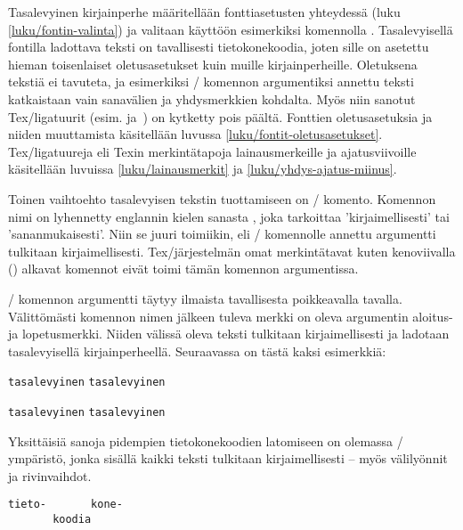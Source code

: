 Tasalevyinen kirjainperhe määritellään fonttiasetusten yhteydessä (luku
\ref{luku/fontin-valinta}) ja valitaan käyttöön esimerkiksi komennolla
. Tasalevyisellä fontilla ladottava teksti on
tavallisesti tietokonekoodia, joten sille on asetettu hieman
toisenlaiset oletusasetukset kuin muille kirjainperheille. Oletuksena
tekstiä ei tavuteta, ja esimerkiksi \-/ komennon
argumentiksi annettu teksti katkaistaan vain sanavälien ja yhdysmerkkien
kohdalta. Myös niin sanotut Tex\-/ligatuurit (esim. 
ja~\koodi{--}) on kytketty pois päältä. Fonttien oletusasetuksia ja
niiden muuttamista käsitellään luvussa
\ref{luku/fontit-oletusasetukset}. Tex\-/ligatuureja eli Texin
merkintätapoja lainausmerkeille ja ajatusviivoille käsitellään luvuissa
\ref{luku/lainausmerkit} ja \ref{luku/yhdys-ajatus-miinus}.

Toinen vaihtoehto tasalevyisen tekstin tuottamiseen on
\-/ komento. Komennon nimi on lyhennetty englannin kielen
sanasta , joka tarkoittaa 'kirjaimellisesti' tai
'sananmukaisesti'. Niin se juuri toimiikin, eli \-/
komennolle annettu argumentti tulkitaan kirjaimellisesti.
Tex\-/järjestelmän omat merkintätavat kuten kenoviivalla (\koodi{\keno})
alkavat komennot eivät toimi tämän komennon argumentissa.

\-/ komennon argumentti täytyy ilmaista tavallisesta
poikkeavalla tavalla. Välittömästi komennon nimen jälkeen tuleva merkki
on oleva argumentin aloitus- ja lopetusmerkki. Niiden välissä oleva
teksti tulkitaan kirjaimellisesti ja ladotaan tasalevyisellä
kirjainperheellä. Seuraavassa on tästä kaksi esimerkkiä:

\begin{koodilohkosis}
\verb.tasalevyinen.   %
\verb|tasalevyinen|   %
\end{koodilohkosis}

\begin{tulossis}
  \verb.tasalevyinen.
  \verb|tasalevyinen|
\end{tulossis}

Yksittäisiä sanoja pidempien tietokonekoodien latomiseen on olemassa
\-/ ympäristö, jonka sisällä kaikki teksti
tulkitaan kirjaimellisesti -- myös välilyönnit ja rivinvaihdot.

\begin{koodilohkosis}
\begin{verbatim}
tieto-       kone-
       koodia
\end{verbatim}
\end{koodilohkosis}


